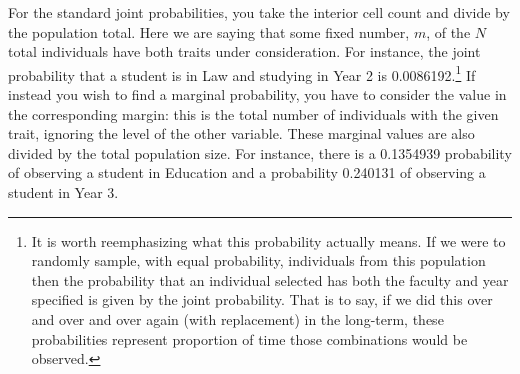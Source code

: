\documentclass[
  letterpaper,
  DIV=11,
  numbers=noendperiod]{scrreprt}
\theoremstyle{definition}
\theoremstyle{definition}
\theoremstyle{definition}
\theoremstyle{remark}
\begin{document}
\begin{table}

\caption{\label{tbl-uni-prop}Proportions of enrolment by faculty and
year of study in a university.}


\end{table}%

For the standard joint probabilities, you take the interior cell count
and divide by the population total. Here we are saying that some fixed
number, \(m\), of the \(N\) total individuals have both traits under
consideration. For instance, the joint probability that a student is in
Law and studying in Year 2 is 0.0086192.\footnote{It is worth
  reemphasizing what this probability actually means. If we were to
  randomly sample, with equal probability, individuals from this
  population then the probability that an individual selected has both
  the faculty and year specified is given by the joint probability. That
  is to say, if we did this over and over and over again (with
  replacement) in the long-term, these probabilities represent
  proportion of time those combinations would be observed.} If instead
you wish to find a marginal probability, you have to consider the value
in the corresponding margin: this is the total number of individuals
with the given trait, ignoring the level of the other variable. These
marginal values are also divided by the total population size. For
instance, there is a 0.1354939 probability of observing a student in
Education and a probability 0.240131 of observing a student in Year 3.
\end{document}
